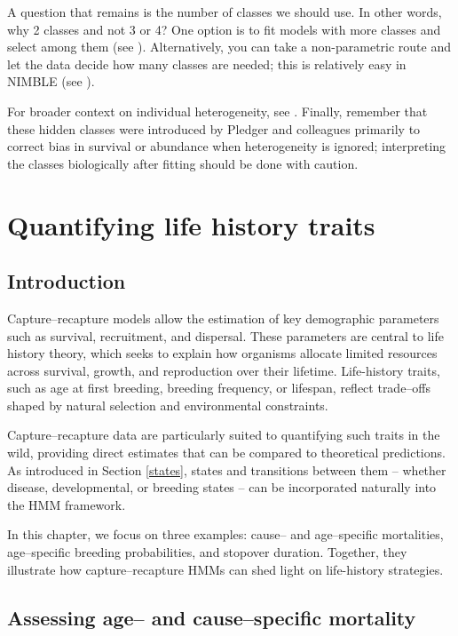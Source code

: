 \documentclass[
  12pt,
]{krantz}
\begin{document}
A question that remains is the number of classes we should use. In other words, why 2 classes and not 3 or 4? One option is to fit models with more classes and select among them (see \citet{cubaynes2012}). Alternatively, you can take a non-parametric route and let the data decide how many classes are needed; this is relatively easy in NIMBLE (see \citet{turek_bayesian_2021}).

For broader context on individual heterogeneity, see \citet{gimenez2018ih}. Finally, remember that these hidden classes were introduced by Pledger and colleagues primarily to correct bias in survival or abundance when heterogeneity is ignored; interpreting the classes biologically after fitting should be done with caution.

\chapter{Quantifying life history traits}\label{tradeoffs}

\section{Introduction}\label{introduction-10}

Capture--recapture models allow the estimation of key demographic parameters such as survival, recruitment, and dispersal. These parameters are central to life history theory, which seeks to explain how organisms allocate limited resources across survival, growth, and reproduction over their lifetime. Life-history traits, such as age at first breeding, breeding frequency, or lifespan, reflect trade--offs shaped by natural selection and environmental constraints.

Capture--recapture data are particularly suited to quantifying such traits in the wild, providing direct estimates that can be compared to theoretical predictions. As introduced in Section \ref{states}, states and transitions between them -- whether disease, developmental, or breeding states -- can be incorporated naturally into the HMM framework.

In this chapter, we focus on three examples: cause-- and age--specific mortalities, age--specific breeding probabilities, and stopover duration. Together, they illustrate how capture--recapture HMMs can shed light on life-history strategies.

\section{Assessing age-- and cause--specific mortality}\label{assessing-age-and-causespecific-mortality}
\end{document}
